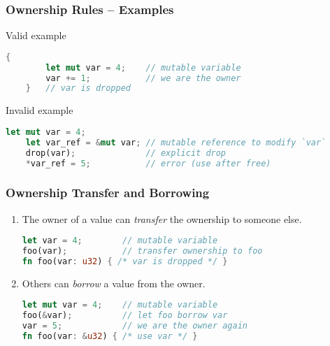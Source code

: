 \begin{frame}[fragile]
    \frametitle{Ownership Rules -- Examples}

    \begin{block}{Valid example}
    \begin{lstlisting}[language=rust]
    {
        let mut var = 4;    // mutable variable
        var += 1;           // we are the owner
    }   // var is dropped
    \end{lstlisting}
    \end{block}

    \begin{block}{Invalid example}
    \begin{lstlisting}[language=rust]
    let mut var = 4;
    let var_ref = &mut var; // mutable reference to modify `var`
    drop(var);              // explicit drop
    *var_ref = 5;           // error (use after free)
    \end{lstlisting}
    \end{block}
\end{frame}

\begin{frame}[fragile]
    \frametitle{Ownership Transfer and Borrowing}

    \begin{enumerate}
        \item The owner of a value can \emph{transfer} the ownership to someone else.
    \begin{lstlisting}[language=rust]
let var = 4;        // mutable variable
foo(var);           // transfer ownership to foo
fn foo(var: u32) { /* var is dropped */ }
    \end{lstlisting}
        \item Others can \emph{borrow} a value from the owner.
    \begin{lstlisting}[language=rust]
let mut var = 4;    // mutable variable
foo(&var);          // let foo borrow var
var = 5;            // we are the owner again
fn foo(var: &u32) { /* use var */ }
    \end{lstlisting}
    \end{enumerate}
\end{frame}
